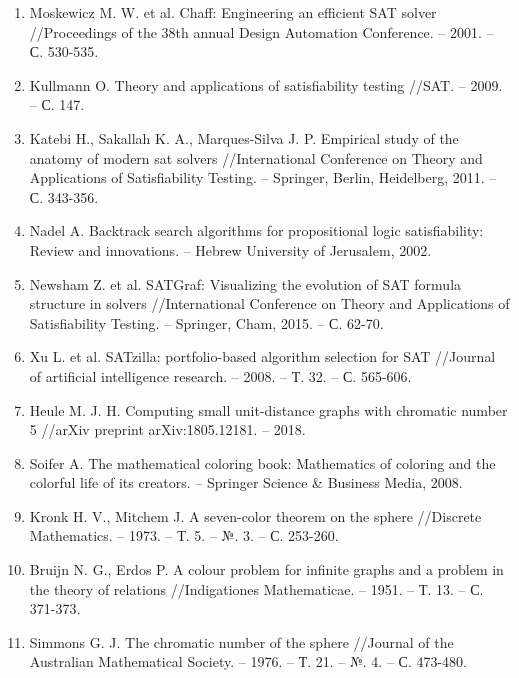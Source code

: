 \begin{enumerate}[leftmargin=0.5cm,topsep=0pt,itemsep=-1ex,partopsep=1ex,parsep=1ex,ref=\arabic{*},label=\arabic{*}.]
\item\label{bib:Moskewicz}
Moskewicz M. W. et al. Chaff: Engineering an efficient SAT solver //Procee\-dings of the 38th annual Design Automation Conference. – 2001. – С. 530-535.

\item\label{bib:Kullmann2009}
Kullmann O. Theory and applications of satisfiability testing //SAT. – 2009. – С. 147.

\item\label{bib:Katebi}
Katebi H., Sakallah K. A., Marques-Silva J. P. Empirical study of the anatomy of modern sat solvers //International Conference on Theory and Applications of Satisfiability Testing. – Springer, Berlin, Heidelberg, 2011. – С. 343-356.

\item\label{bib:Nadel2002}
Nadel A. Backtrack search algorithms for propositional logic satisfiability: Review and innovations. – Hebrew University of Jerusalem, 2002.

\item\label{bib:Newsham}
Newsham Z. et al. SATGraf: Visualizing the evolution of SAT formula struc\-tu\-re in solvers //International Conference on Theory and Applications of Satisfiabi\-li\-ty Testing. – Springer, Cham, 2015. – С. 62-70.

\item\label{bib:SATzilla}
Xu L. et al. SATzilla: portfolio-based algorithm selection for SAT //Journal of artificial intelligence research. – 2008. – Т. 32. – С. 565-606.

\item\label{bib:Heule2018}
Heule M. J. H. Computing small unit-distance graphs with chromatic number 5 //arXiv preprint arXiv:1805.12181. – 2018.

\item\label{bib:Soifer}
Soifer A. The mathematical coloring book: Mathematics of coloring and the colorful life of its creators. – Springer Science \& Business Media, 2008.

\item\label{bib:Kronk}
Kronk H. V., Mitchem J. A seven-color theorem on the sphere //Discrete Mathematics. – 1973. – Т. 5. – №. 3. – С. 253-260.

\item\label{bib:BruijnErdos}
Bruijn N. G., Erdos P. A colour problem for infinite graphs and a problem in the theory of relations //Indigationes Mathematicae. – 1951. – Т. 13. – С. 371-373.

\item\label{bib:Simmons}
Simmons G. J. The chromatic number of the sphere //Journal of the Austra\-li\-an Mathematical Society. – 1976. – Т. 21. – №. 4. – С. 473-480.


\end{enumerate}
